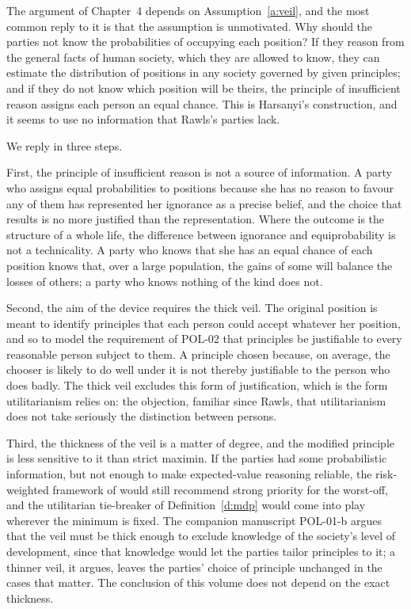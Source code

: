 \documentclass{situationist-preprint}
\begin{document}
The argument of Chapter~4 depends on Assumption~\ref{a:veil}, and the most common reply to it is that the assumption is unmotivated. Why should the parties not know the probabilities of occupying each position? If they reason from the general facts of human society, which they are allowed to know, they can estimate the distribution of positions in any society governed by given principles; and if they do not know which position will be theirs, the principle of insufficient reason assigns each person an equal chance. This is Harsanyi's construction, and it seems to use no information that Rawls's parties lack.

We reply in three steps.

First, the principle of insufficient reason is not a source of information. A party who assigns equal probabilities to positions because she has no reason to favour any of them has represented her ignorance as a precise belief, and the choice that results is no more justified than the representation. Where the outcome is the structure of a whole life, the difference between ignorance and equiprobability is not a technicality. A party who knows that she has an equal chance of each position knows that, over a large population, the gains of some will balance the losses of others; a party who knows nothing of the kind does not.

Second, the aim of the device requires the thick veil. The original position is meant to identify principles that each person could accept whatever her position, and so to model the requirement of POL-02 that principles be justifiable to every reasonable person subject to them. A principle chosen because, on average, the chooser is likely to do well under it is not thereby justifiable to the person who does badly. The thick veil excludes this form of justification, which is the form utilitarianism relies on: the objection, familiar since Rawls, that utilitarianism does not take seriously the distinction between persons.

Third, the thickness of the veil is a matter of degree, and the modified principle is less sensitive to it than strict maximin. If the parties had some probabilistic information, but not enough to make expected-value reasoning reliable, the risk-weighted framework of \citet{Buchak2017} would still recommend strong priority for the worst-off, and the utilitarian tie-breaker of Definition~\ref{d:mdp} would come into play wherever the minimum is fixed. The companion manuscript POL-01-b argues that the veil must be thick enough to exclude knowledge of the society's level of development, since that knowledge would let the parties tailor principles to it; a thinner veil, it argues, leaves the parties' choice of principle unchanged in the cases that matter. The conclusion of this volume does not depend on the exact thickness.
\end{document}
